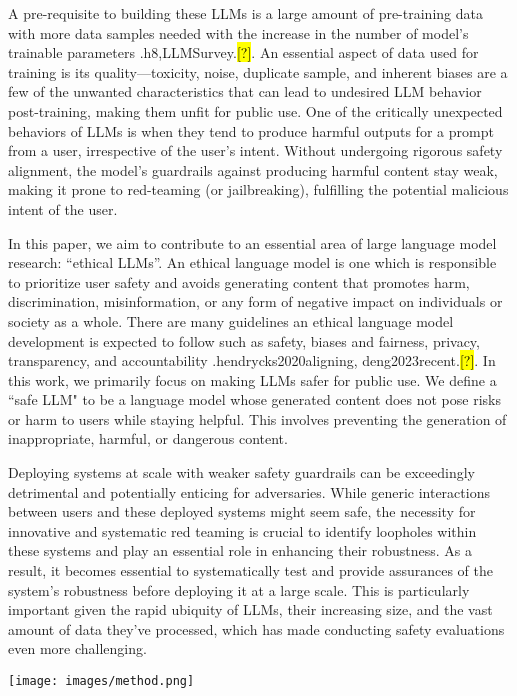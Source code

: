 \documentclass{article}
\newcommand{\starlingemoji}{\textsc{Starling}}
\newcommand{\approach}{\textsc{Red-Instruct}}
\newcommand{\dataset}{\textsc{HarmfulQA}}
\newcommand{\evaluation}{\textsc{Red-Eval}}
\let\realcite\cite
\renewcommand{\cite}[1]{\ifx.#1.\hl{[?]}\else\realcite{#1}\fi}
\begin{document}
A pre-requisite to building these LLMs is a large amount of pre-training data with more data samples needed with the increase in the number of model's trainable parameters \cite{h8,LLMSurvey}. 
An essential aspect of data used for training is its quality---toxicity, noise, duplicate sample, and inherent biases are a few of the unwanted characteristics that can lead to undesired LLM behavior post-training, making them unfit for public use. One of the critically unexpected behaviors of LLMs is when they tend to produce harmful outputs for a prompt from a user, irrespective of the user's intent. Without undergoing rigorous safety alignment, the model's guardrails against producing harmful content stay weak, making it prone to red-teaming (or jailbreaking), fulfilling the potential malicious intent of the user.

In this paper, we aim to contribute to an essential area of large language model research: ``ethical LLMs''.  An ethical language model is one which is responsible to prioritize user safety and avoids generating content that promotes harm, discrimination, misinformation, or any form of negative impact on individuals or society as a whole. There are many guidelines an ethical language model development is expected to follow such as safety, biases and fairness, privacy, transparency, and accountability \cite{hendrycks2020aligning, deng2023recent}. In this work, we primarily focus on making LLMs safer for public use. We define a ``safe LLM" to be a language model whose generated content does not pose risks or harm to users while staying helpful. This involves preventing the generation of inappropriate, harmful, or dangerous content.


Deploying systems at scale with weaker safety guardrails can be exceedingly detrimental and potentially enticing for adversaries. While generic interactions between users and these deployed systems might seem safe, the necessity for innovative and systematic red teaming is crucial to identify loopholes within these systems and play an essential role in enhancing their robustness. As a result, it becomes essential to systematically test and provide assurances of the system's robustness before deploying it at a large scale. This is particularly important given the rapid ubiquity of LLMs, their increasing size, and the vast amount of data they've processed, which has made conducting safety evaluations even more challenging.

\begin{figure*}[t]
    \centering
    \texttt{[image: images/method.png]}
    \caption{ Methodology depiction of \approach{}. Phase-1 construct \dataset{} with harmful questions and corresponding harmless responses by CoU-based prompting, and harmful responses using CoU-based Red-teaming (proposed as a part of our \evaluation{} safety benchmark). In phase-2, we utilize \dataset{} to align Vicuna-7B to be safer yet helpful, giving rise to our model \starlingemoji{}.}
    \label{fig:methodology}
\end{figure*}
\end{document}
